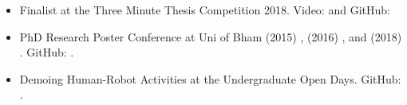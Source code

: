 \documentclass{mycv}
\begin{document}
\begin{itemize}

\item  Finalist at the Three Minute Thesis Competition 2018.
	Video: \href{https://www.youtube.com/watch?v=07ewRYcS-0g}{\faYoutube} and
	GitHub: \href{https://github.com/mxochicale/3mt}{\faGithub*}
\item PhD Research Poster Conference at Uni of Bham
	(2015) \href{https://github.com/mxochicale/PhD/blob/master/posters/Research_Poster_Conference_UoB/2015/poster/poster.pdf}{\faImage},
	(2016) \href{https://github.com/mxochicale/PhD/blob/master/posters/Research_Poster_Conference_UoB/2016/poster/poster.pdf}{\faImage}, and
	(2018) \href{https://github.com/mxochicale/PhD/blob/master/posters/Research_Poster_Conference_UoB/2018/poster/main/map479-poster-uob2018.pdf}{\faImage}.
	GitHub: \href{https://github.com/mxochicale/PhD/tree/master/posters/Research_Poster_Conference_UoB}{\faGithub*}.
\item Demoing Human-Robot Activities at the Undergraduate Open Days.
	GitHub: \href{https://github.com/mxochicale/opendayuob-hridemo}{\faGithub*}.







\end{itemize}
\end{document}
